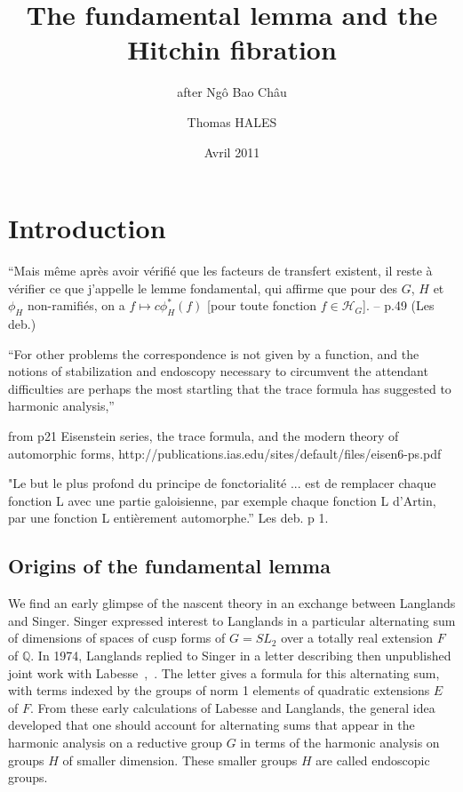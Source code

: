 \documentclass[brochure,english,12pt]{bourbaki}
\date{Avril 2011}
\title{The fundamental lemma and the Hitchin fibration}
\subtitle{after Ng\^o Bao Ch\^au}
\author{Thomas HALES}
\newcommand{\ring}[1]{\mathbb{#1}}
\begin{document}
\maketitle


\section{Introduction}



{\narrower \it

``Mais m\^eme apr\`es avoir
v\'erifi\'e que les facteurs de
transfert existent, il reste \`a v\'erifier ce que j'appelle le
lemme fondamental, qui affirme que pour des $G$, $H$ et $\phi_H$
non-ramifi\'es, on a $f\mapsto c \phi_H^*(f)$ [pour toute fonction $f\in {\mathcal H}_G$]. -- p.49 (Les deb.)  
}

\bigskip

``For other problems the correspondence is not given by a function, and the notions of 
stabilization and endoscopy necessary to circumvent the attendant difficulties are perhaps 
the most startling that the trace formula has suggested to harmonic analysis,'' 

from p21 Eisenstein series, the trace formula, and the modern theory of automorphic forms, http://publications.ias.edu/sites/default/files/eisen6-ps.pdf

"Le but le plus profond du principe de fonctorialit\'e ... est de remplacer chaque fonction L avec une partie galoisienne, par exemple chaque fonction L d'Artin, par une fonction L enti\`erement automorphe.'' Les deb. p 1.





\subsection{Origins of the fundamental lemma}

We find an early glimpse of the nascent theory in an exchange between Langlands and Singer.  Singer
expressed interest to Langlands in a particular alternating sum of
dimensions of spaces of cusp forms of $G=SL_2$ over a totally real
extension $F$ of $\ring{Q}$.  In 1974, Langlands replied to Singer in
a letter describing then unpublished joint work with
Labesse~\cite{Singer},~\cite{LL}.  The letter gives a formula for
this alternating sum, with terms indexed by the groups of norm 1
elements of quadratic extensions $E$ of $F$.  From these early
calculations of Labesse and Langlands, the general idea  developed that one should account for
alternating sums that appear in the
harmonic analysis on a reductive group $G$ in terms of the harmonic analysis on groups $H$ of smaller dimension.  
These smaller groups $H$ are called endoscopic groups.  
\end{document}
